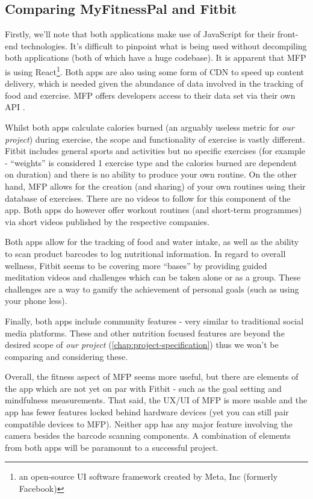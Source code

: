 \subsection{Comparing MyFitnessPal and Fitbit}
Firstly, we'll note that both applications make use of JavaScript for their front-end technologies.
It's difficult to pinpoint what is being used without decompiling both applications (both of which have a huge codebase).
It is apparent that MFP is using React\footnote{an open-source UI software framework created by Meta, Inc (formerly Facebook)}.
Both apps are also using some form of CDN to speed up content delivery, which is needed given the abundance of data involved in
the tracking of food and exercise. MFP offers developers access to their data set via their own API \cite{mfp-api}.
\par
Whilst both apps calculate calories burned (an arguably useless metric for \textit{our project})
during exercise, the scope and functionality of exercise is vastly different.
Fitbit includes general sports and activities but no specific exercises (for example
- ``weights'' is considered 1 exercise type and the calories burned are dependent on duration)
and there is no ability
to produce your own routine.
On the other hand, MFP allows for the creation (and sharing) of your own routines using their
database of exercises. There are no videos to follow for this component of the app.
Both apps do however offer workout routines (and short-term programmes) via 
short videos published by the respective companies.
\par
Both apps allow for the tracking of food and water intake, as well as the ability
to scan product barcodes to log nutritional information. In regard to overall wellness,
Fitbit seems to be covering more ``bases'' by providing guided meditation videos and challenges
which can be taken alone or as a group. These challenges are a way to gamify the achievement of
personal goals (such as using your phone less).
\par
Finally, both apps include community features - very similar to traditional social media platforms.
These and other nutrition focused features are beyond the desired scope of \textit{our project} (\cref{chap:project-specification}) thus we won't be
comparing and considering these.
\par
Overall, the fitness aspect of MFP seems more useful, but there are elements of the app which are not yet
on par with Fitbit - such as the goal setting and mindfulness measurements. 
That said, the UX/UI of MFP is more usable and the app has fewer features locked behind hardware devices
(yet you can still pair compatible devices to MFP). Neither app has any major feature involving the camera besides
the barcode scanning components. A combination of elements from both apps will be paramount to a successful project.
\par

